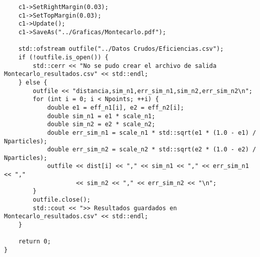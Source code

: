 \begin{lstlisting}
    c1->SetRightMargin(0.03);
    c1->SetTopMargin(0.03);
    c1->Update();
    c1->SaveAs("../Graficas/Montecarlo.pdf");

    std::ofstream outfile("../Datos Crudos/Eficiencias.csv");
    if (!outfile.is_open()) {
        std::cerr << "No se pudo crear el archivo de salida Montecarlo_resultados.csv" << std::endl;
    } else {
        outfile << "distancia,sim_n1,err_sim_n1,sim_n2,err_sim_n2\n";
        for (int i = 0; i < Npoints; ++i) {
            double e1 = eff_n1[i], e2 = eff_n2[i];
            double sim_n1 = e1 * scale_n1;
            double sim_n2 = e2 * scale_n2;
            double err_sim_n1 = scale_n1 * std::sqrt(e1 * (1.0 - e1) / Nparticles);
            double err_sim_n2 = scale_n2 * std::sqrt(e2 * (1.0 - e2) / Nparticles);
            outfile << dist[i] << "," << sim_n1 << "," << err_sim_n1 << ","
                    << sim_n2 << "," << err_sim_n2 << "\n";
        }
        outfile.close();
        std::cout << ">> Resultados guardados en Montecarlo_resultados.csv" << std::endl;
    }

    return 0;
}
\end{lstlisting}
